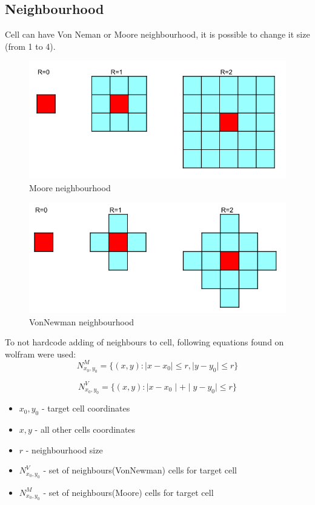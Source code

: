 \documentclass[a4paper, 11pt]{article}
\begin{document}
\subsection{Neighbourhood}
Cell can have Von Neman or Moore neighbourhood, it is possible to change it size (from 1 to 4).
\begin{figure}[H]
\includegraphics[scale=0.5]{moore.png} 
\caption{Moore neighbourhood}
\end{figure}
\begin{figure}[H]
\includegraphics[scale=0.5]{vonnewman.png} 
\caption{VonNewman neighbourhood}
\end{figure}
To not hardcode adding of neighbours to cell, following equations found on wolfram \cite{moore}\cite{vonnewman} were used:\\
\begin{equation}
	N^{M}_{x_0,y_0}=\{ \left(x,y\right): \mid x-x_0 \mid \leq r, \mid y-y_0 \mid \leq r   \}  
\end{equation}

\begin{equation}
	N^{V}_{x_0,y_0}=\{ \left(x,y\right): \mid x-x_0 \mid + \mid y-y_0 \mid \leq r   \} 
\end{equation}

\begin{itemize}
	\item $x_0,y_0$ - target cell coordinates
	\item $x,y$ - all other cells coordinates
	\item $r$ - neighbourhood size	
	\item $N^{V}_{x_0,y_0}$ - set of neighbours(VonNewman) cells for target cell
	\item $N^{M}_{x_0,y_0}$ - set of neighbours(Moore) cells for target cell
\end{itemize}
\end{document}
